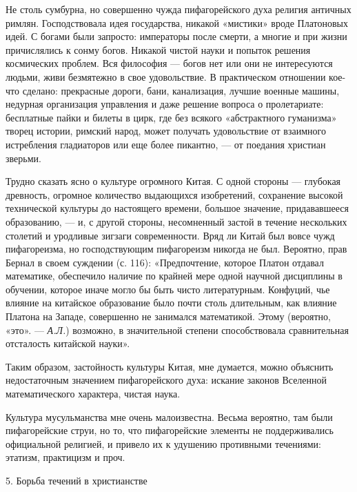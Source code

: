 Не столь сумбурна, но совершенно чужда пифагорейского духа религия античных
римлян. Господствовала идея государства, никакой «мистики» вроде Платоновых
идей. С богами были запросто: императоры после смерти, а многие и при жизни
причислялись к сонму богов. Никакой чистой науки и попыток решения космических
проблем. Вся философия --- богов нет или они не интересуются людьми, живи
безмятежно в свое удовольствие. В практическом отношении кое-что сделано:
прекрасные дороги, бани, канализация, лучшие военные машины, недурная
организация управления и даже решение вопроса о пролетариате: бесплатные пайки
и билеты в цирк, где без всякого «абстрактного гуманизма» творец истории,
римский народ, может получать удовольствие от взаимного истребления гладиаторов
или еще более пикантно, --- от поедания христиан зверьми.

Трудно сказать ясно о культуре огромного Китая. С одной стороны
--- глубокая древность, огромное количество выдающихся изобретений,
сохранение высокой технической культуры до настоящего времени,
большое значение, придававшееся образованию, --- и, с другой стороны,
несомненный застой в течение нескольких столетий и уродливые зигзаги
современности. Вряд ли Китай был вовсе чужд пифагореизма, но
господствующим пифагореизм никогда не был. Вероятно, прав Бернал
в своем суждении (с. 116): «Предпочтение, которое Платон отдавал
математике, обеспечило наличие по крайней мере одной научной
дисциплины в обучении, которое иначе могло бы быть чисто литературным.
Конфуций, чье влияние на китайское образование было почти столь
длительным, как влияние Платона на Западе, совершенно не занимался
математикой. Этому (вероятно, «это». --- \emph{А.Л.}) возможно, в
значительной степени способствовала сравнительная отсталость китайской
науки».

Таким образом, застойность культуры Китая, мне думается, можно объяснить
недостаточным значением пифагорейского духа: искание законов Вселенной
математического характера, чистая наука.

Культура мусульманства мне очень малоизвестна. Весьма вероятно, там были
пифагорейские струи, но то, что пифагорейские элементы не поддерживались
официальной религией, и привело их к удушению противными течениями: этатизм,
практицизм и проч.

5. Борьба течений в христианстве

